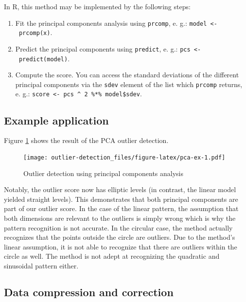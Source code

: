 \documentclass[]{report}
\providecommand{\tightlist}{%
  \setlength{\itemsep}{0pt}\setlength{\parskip}{0pt}}
\theoremstyle{definition}
\theoremstyle{definition}
\theoremstyle{definition}
\theoremstyle{remark}
\begin{document}
In R, this method may be implemented by the following steps:

\begin{enumerate}
\def\labelenumi{\arabic{enumi}.}
\tightlist
\item
  Fit the principal components analysis using \texttt{prcomp}, e. g.:
  \texttt{model\ \textless{}-\ prcomp(x)}.
\item
  Predict the principal components using \texttt{predict}, e. g.:
  \texttt{pcs\ \textless{}-\ predict(model)}.
\item
  Compute the score. You can access the standard deviations of the
  different principal components via the \texttt{sdev} element of the
  list which \texttt{prcomp} returns, e. g.:
  \texttt{score\ \textless{}-\ pcs\ \^{}\ 2\ \%*\%\ model\$sdev}.
\end{enumerate}

\hypertarget{example-application-1}{%
\subsection{Example application}\label{example-application-1}}

Figure \ref{fig:pca-ex} shows the result of the PCA outlier detection.

\begin{figure}
\centering
\texttt{[image: outlier-detection\_files/figure-latex/pca-ex-1.pdf]}
\caption{\label{fig:pca-ex}Outlier detection using principal components
analysis}
\end{figure}

Notably, the outlier score now has elliptic levels (in contrast, the
linear model yielded straight levels). This demonstrates that both
principal components are part of our outlier score. In the case of the
linear pattern, the assumption that both dimensions are relevant to the
outliers is simply wrong which is why the pattern recognition is not
accurate. In the circular case, the method actually recognizes that the
points outside the circle are outliers. Due to the method's linear
assumption, it is not able to recognize that there are outliers within
the circle as well. The method is not adept at recognizing the quadratic
and sinusoidal pattern either.

\hypertarget{data-compression-and-correction-1}{%
\subsection{Data compression and
correction}\label{data-compression-and-correction-1}}
\end{document}
